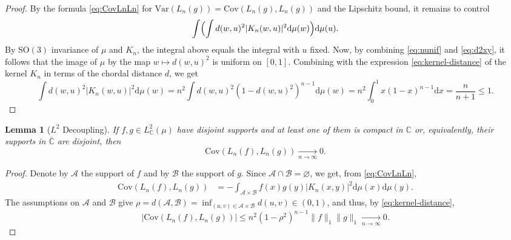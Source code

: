 \documentclass[10pt,reqno]{amsart}
\numberwithin{equation}{section}
\numberwithin{figure}{section}
\theoremstyle{plain}
\newtheorem{lemma}[theorem]{Lemma}
\newcommand{\<}{\langle}
\renewcommand{\>}{\rangle}
\begin{document}
\begin{proof}
  By the formula \eqref{eq:CovLnLn} for $\mathrm{Var}(L_n(g))=\mathrm{Cov}(L_n(g),L_n(g))$ and
  the Lipschitz bound, it remains to control 
  \begin{equation}
    \int\Bigl(\int d(w,u)^2|K_n(w,u)|^2\mathrm{d}\mu(w)\Bigr)\mathrm{d}\mu(u).
  \end{equation}
  By $\mathrm{SO}(3)$ invariance of $\mu$ and $K_n$, the integral above equals the
  integral with $u$ fixed. 
  Now, by combining \eqref{eq:nunif} and \eqref{eq:d2xy}, it follows that the image
  of $\mu$ by the map $w\mapsto d(w,u)^2$ is uniform on $[0,1]$.
Combining with the expression \eqref{eq:kernel-distance} of the kernel $K_n$ in terms of the chordal distance $d$, we get
\begin{equation}
    \int d(w,u)^2|K_n(w,u)|^2\mathrm{d}\mu(w)
    =n^2\int d(w,u)^2(1-d(w,u)^2)^{n-1}\mathrm{d}\mu(w)
    =n^2\int_0^1x(1-x)^{n-1}\mathrm{d}x
    =\frac{n}{n+1}\leq 1.
  \end{equation}
\end{proof}

%
%
%
%
%
%
%
%
%
%
%
%
%

%
%
%
%
%
%
%
%
%
%
%
%
%
%
%
%
%
%

\begin{lemma}[$L^2$ Decoupling] \label{lem:Covariance}
 If $f,g \in L^2_{\mathbb C}(\mu)$ have disjoint supports and at least one of them is compact in $\mathbb C$ or, equivalently,
 their supports in $\overline{\mathbb C}$ 
 are disjoint, then 
 \begin{equation}
  \mathrm{Cov}(L_n(f),L_n(g)) \xrightarrow[n\to\infty]{} 0.
  \end{equation}
\end{lemma}

\begin{proof}
	Denote by $\mathcal{A}$ the support of $f$ and by 
	$\mathcal{B}$ the support of $g$. Since $\mathcal{A}\cap\mathcal{B}=\varnothing$, we get,
    from \eqref{eq:CovLnLn},
	\begin{align*}
	\mathrm{Cov}(L_n(f),L_n(g))
	&= -
	\int_{\mathcal{A}\times\mathcal{B}}
	f(x) g(y) |K_n(x,y)|^2 \mathrm d \mu(x) \mathrm d \mu(y).							
	\end{align*}
	The assumptions on $\mathcal{A}$ and $\mathcal{B}$ give $\rho=d(\mathcal{A},\mathcal{B})=\inf_{(u,v)\in\mathcal{A}\times\mathcal{B}}d(u,v)\in(0,1)$, and thus, by \eqref{eq:kernel-distance},  
	\begin{equation}
	|\mathrm{Cov}(L_n(f),L_n(g))|
	\leq n^2(1-\rho^2)^{n-1}\|f\|_1\|g\|_1 
    \xrightarrow[n \to \infty]{}0. 
    \end{equation}
\end{proof}
\end{document}
